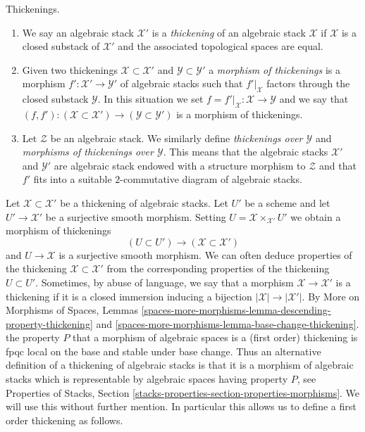 \begin{definition}
\label{definition-thickening}
Thickenings.
\begin{enumerate}
\item We say an algebraic stack $\mathcal{X}'$ is a {\it thickening}
of an algebraic stack $\mathcal{X}$ if $\mathcal{X}$ is a closed substack
of $\mathcal{X}'$ and the associated topological spaces are equal.
\item Given two thickenings $\mathcal{X} \subset \mathcal{X}'$ and
$\mathcal{Y} \subset \mathcal{Y}'$ a {\it morphism of thickenings}
is a morphism $f' : \mathcal{X}' \to \mathcal{Y}'$ of algebraic stacks
such that $f'|_\mathcal{X}$ factors through the closed
substack $\mathcal{Y}$. In this situation we set
$f = f'|_\mathcal{X} : \mathcal{X} \to \mathcal{Y}$ and we say that
$(f, f') : (\mathcal{X} \subset \mathcal{X}') \to
(\mathcal{Y} \subset \mathcal{Y}')$ is a morphism of thickenings.
\item Let $\mathcal{Z}$ be an algebraic stack. We similarly define
{\it thickenings over $\mathcal{Y}$} and
{\it morphisms of thickenings over $\mathcal{Y}$}.
This means that the algebraic stacks
$\mathcal{X}'$ and $\mathcal{Y}'$
are algebraic stack endowed with a structure
morphism to $\mathcal{Z}$ and that $f'$ fits into a suitable
$2$-commutative diagram of algebraic stacks.
\end{enumerate}
\end{definition}

\noindent
Let $\mathcal{X} \subset \mathcal{X}'$ be a thickening of algebraic stacks.
Let $U'$ be a scheme and let $U' \to \mathcal{X}'$ be a surjective smooth
morphism. Setting $U = \mathcal{X} \times_{\mathcal{X}'} U'$ we obtain
a morphism of thickenings
$$
(U \subset U') \longrightarrow (\mathcal{X} \subset \mathcal{X}')
$$
and $U \to \mathcal{X}$ is a surjective smooth morphism. We can often
deduce properties of the thickening $\mathcal{X} \subset \mathcal{X}'$
from the corresponding properties of the thickening $U \subset U'$.
Sometimes, by abuse of language, we say that a morphism
$\mathcal{X} \to \mathcal{X}'$ is a thickening if it is a closed
immersion inducing a bijection $|\mathcal{X}| \to |\mathcal{X}'|$.
By More on Morphisms of Spaces, Lemmas
\ref{spaces-more-morphisms-lemma-descending-property-thickening} and
\ref{spaces-more-morphisms-lemma-base-change-thickening}.
the property $P$ that a morphism of algebraic spaces is a
(first order) thickening is fpqc local on the base and stable under base
change. Thus an alternative definition of a
thickening of algebraic stacks is that it is a morphism of algebraic
stacks which is representable by algebraic spaces having property $P$, see
Properties of Stacks, Section
\ref{stacks-properties-section-properties-morphisms}.
We will use this without further mention.
In particular this allows us to define a first order thickening
as follows.

